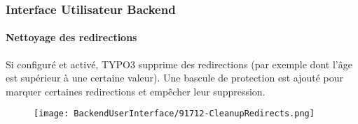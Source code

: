 %

\begin{frame}[fragile]
	\frametitle{Interface Utilisateur Backend}
	\framesubtitle{Nettoyage des redirections}

	Si configuré et activé, TYPO3 supprime des redirections (par exemple dont
	l'âge est supérieur à une certaine valeur).
	Une bascule de protection est ajouté pour marquer certaines redirections
	et empêcher leur suppression.

	\begin{figure}
		\texttt{[image: BackendUserInterface/91712-CleanupRedirects.png]}
	\end{figure}

\end{frame}

